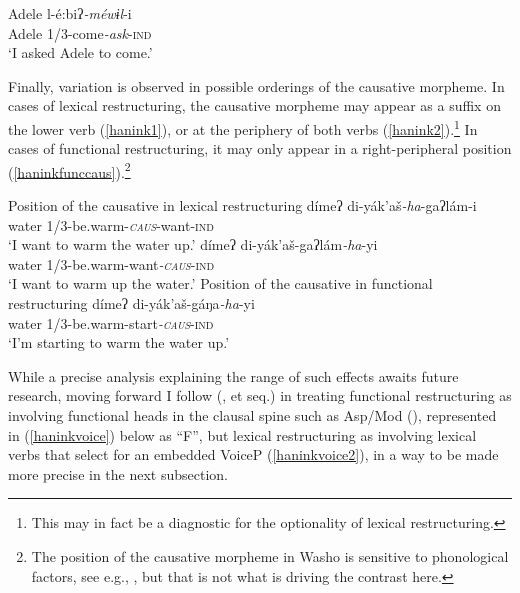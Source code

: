 \documentclass[output=paper]{langscibook}
\begin{document}
\ea
\gll Adele l-é:biʔ{\itshape -méwɨl}-i\\
Adele 1/3-come{\itshape -ask}-{\scshape ind}\\
\glt `I asked Adele to come.' \label{haninkobjectcontrol}
\z 


Finally, variation is observed in possible orderings of the causative morpheme. In cases of lexical restructuring, the causative morpheme may appear as a suffix on the lower verb (\ref{hanink1}), or at the periphery of both verbs (\ref{hanink2}).\footnote{This may in fact be a diagnostic for the optionality of lexical restructuring.} In cases of functional restructuring, it may only appear in a right-peripheral position (\ref{haninkfunccaus}).\footnote{The position of the causative morpheme in Washo is sensitive to phonological factors, see e.g.,  \citealt{jacobsen1973,benz2018}, but that is not what is driving the contrast here.} 

\ea Position of the causative in lexical restructuring
\ea \gll dímeʔ di-yák'aš{\itshape-ha}-gaʔlám-i\\
water 1/3-be.warm-\textit{\textsc{caus}}-want{\scshape-ind}\\
\glt `I want to warm the water up.' \label{hanink1}
\ex \gll dímeʔ di-yák'aš-gaʔlám{\itshape -ha}-yi\\
water 1/3-be.warm-want\textit{\textsc{-caus}}{\scshape-ind}\\
\glt `I want to warm up the water.' \label{hanink2}
\z
\ex Position of the causative in functional restructuring\label{haninkfunccaus}
\ea \gll dímeʔ di-yák'aš-gáŋa{\itshape-ha}-yi\\
water 1/3-be.warm-start\textit{\textsc{-caus}}{\scshape-ind}\\
\glt `I'm starting to warm the water up.' \label{hanink3}
\z
\z



While a precise analysis explaining the range of such effects awaits future research, moving forward I follow \citeauthor{wurmbrand2001} (\citeyear{wurmbrand2001}, et seq.) in treating functional restructuring as involving functional heads in the clausal spine such as Asp/Mod (\citealt{cinque2001,cinque2004,grano2012diss}), represented in (\ref{haninkvoice}) below as ``F'', but lexical restructuring as involving lexical verbs that select for an embedded VoiceP (\ref{haninkvoice2}), in a way to be made more precise in the next subsection.
\end{document}
